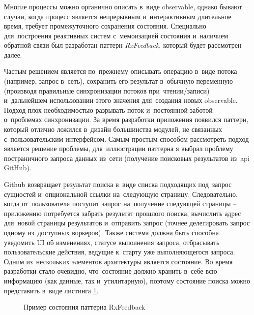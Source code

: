 \subsubsection{}
\label{sec:development:arch:ios:rxfeedback}

Многие процессы можно органично описать в~виде \gls{observable}, однако бывают случаи, когда процесс является непрерывным и~интерактивным длительное время, требует промежуточного сохранения состояния. Специально для~построения реактивных систем с~мемоизацией состояния и~наличием обратной связи был разработан паттерн \emph{RxFeedback}, который будет рассмотрен далее.

Частым решением является по~прежнему описывать операцию в~виде потока (например, запрос в~сеть), сохранить его результат в~обычную переменную (производя правильные синхронизации потоков при~чтении/записи) и~дальнейшем использовании этого значения для~создания новых \gls{observable}. Подход плох необходимостью разрывать поток и~постоянной заботой о~проблемах синхронизации. За время разработки приложения появился паттерн, который отлично ложился в~дизайн большинства модулей, не связанных с~пользовательским интерфейсом.
Самым простым способом рассмотреть подход является решение проблемы, для~иллюстрации паттерна я выбрал проблему постраничного запроса данных из~сети (получение поисковых результатов из~\gls{api} GitHub).

Github возвращает результат поиска в~виде списка подходящих под~запрос сущностей и~опциональной ссылки на~следующую страницу. Следовательно, когда от~пользователя поступит запрос на~получение следующей страницы -- приложению потребуется забрать результат прошлого поиска, вычислить адрес для~новой страницы результатов и~отправить запрос (точнее делегировать запрос одному из~доступных воркеров). Также система должна быть способна уведомить UI об изменениях, статусе выполнения запроса, отбрасывать пользовательские действия, ведущие к~старту уже выполняющегося запроса.
Одним из~нескольких элементов архитектуры является состояние. Во время разработки стало очевидно, что~состояние должно хранить в~себе всю информацию (как данные, так и~утилитарную), поэтому состояние поиска можно представить в~виде листинга \ref{sec:development:arch:ios:rxfeedback:example:state}.

\begin{figure}[h]
  
   \caption{Пример состояния паттерна RxFeedback}
   \label{sec:development:arch:ios:rxfeedback:example:state}
\end{figure}

